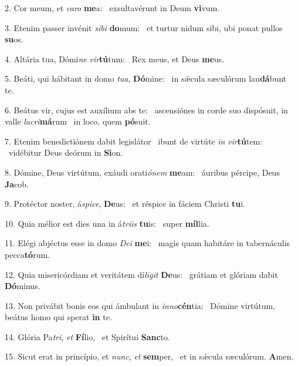 2. Cor meum, et \textit{ca}\textit{ro} \textbf{me}a: \ast\  exsultavérunt in Deum \textbf{vi}vum.\

3. Etenim passer invénit \textit{si}\textit{bi} \textbf{do}mum: \ast\  et turtur nidum sibi, ubi ponat pullos \textbf{su}os.\

4. Altária tua, Dómi\textit{ne} \textit{vir}\textbf{tú}tum: \ast\  Rex meus, et Deus \textbf{me}us.\

5. Beáti, qui hábitant in domo \textit{tu}\textit{a}, \textbf{Dó}mine: \ast\  in sǽcula sæculórum lau\textbf{dá}bunt te.\

6. Beátus vir, cujus est auxílium abs te: \dag\  ascensiónes in corde suo dispósuit, in valle \textit{la}\textit{cri}\textbf{má}rum \ast\  in loco, quem \textbf{pó}suit.\

7. Etenim benedictiónem dabit legislátor \dag\  ibunt de virtúte \textit{in} \textit{vir}\textbf{tú}tem: \ast\  vidébitur Deus deórum in \textbf{Si}on.\

8. Dómine, Deus virtútum, exáudi orati\textit{ó}\textit{nem} \textbf{me}am: \ast\  áuribus pércipe, Deus \textbf{Ja}cob.\

9. Protéctor noster, á\textit{spi}\textit{ce}, \textbf{De}us: \ast\  et réspice in fáciem Christi \textbf{tu}i.\

10. Quia mélior est dies una in á\textit{tri}\textit{is} \textbf{tu}is: \ast\  super \textbf{míl}lia.\

11. Elégi abjéctus esse in domo \textit{De}\textit{i} \textbf{me}i: \ast\  magis quam habitáre in tabernáculis pecca\textbf{tó}rum.\

12. Quia misericórdiam et veritátem dí\textit{li}\textit{git} \textbf{De}us: \ast\  grátiam et glóriam dabit \textbf{Dó}minus.\

13. Non privábit bonis eos qui ámbulant in \textit{in}\textit{no}\textbf{cén}tia: \ast\  Dómine virtútum, beátus homo qui sperat \textbf{in} te.\

14. Glória Pa\textit{tri}, \textit{et} \textbf{Fí}lio, \ast\  et Spirítui \textbf{Sanc}to.\

15. Sicut erat in princípio, et \textit{nunc}, \textit{et} \textbf{sem}per, \ast\  et in sǽcula sæculórum. \textbf{A}men.\

